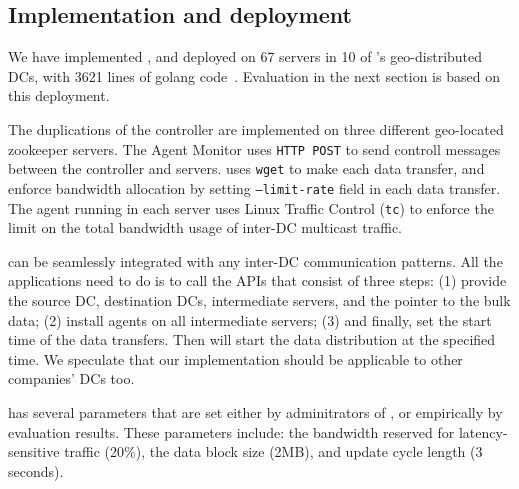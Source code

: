 \subsection{Implementation and deployment}
\label{sec:deployment}

We have implemented \NEW{\name}, and deployed on 67 servers in 10 of
\company's geo-distributed DCs, with 3621 lines of
golang code~\cite{golang}. Evaluation in the next section is
based on this deployment.

The duplications of the controller are implemented on three different
geo-located zookeeper servers. The Agent Monitor uses \texttt{HTTP
POST} to send controll messages between the controller and servers.
\name uses \texttt{wget} to make each data transfer, and enforce
bandwidth allocation by setting \texttt{--limit-rate} field in each
data transfer. The agent running in each server uses Linux Traffic
Control (\texttt{tc}) to enforce the limit on the total bandwidth
usage of inter-DC multicast traffic.

\name can be seamlessly integrated with any inter-DC communication
patterns. All the applications need to do is to call the APIs
that consist of three steps: (1) provide the source DC,
destination DCs, intermediate servers, and the pointer to the bulk
data; (2) install agents on all intermediate servers; (3) and
finally, set the start time of the data transfers. Then \name will
start the data distribution at the specified time. We speculate that
our implementation should be applicable to other companies' DCs too.

\name has several parameters that are set either by adminitrators of
\company, or empirically by evaluation results. These parameters
include: the bandwidth reserved for latency-sensitive traffic (20\%),
the data block size (2MB), and update cycle length (3 seconds). 

